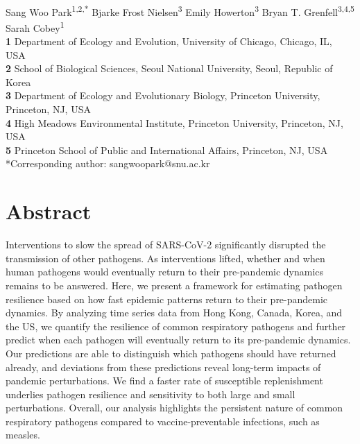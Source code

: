 \documentclass[12pt]{article}
\date{\today}
\begin{document}
\begin{flushleft}{
	\Large
	\textbf{}
}
\newline
\\
Sang Woo Park\textsuperscript{1,2,*}
Bjarke Frost Nielsen\textsuperscript{3}
Emily Howerton\textsuperscript{3}
Bryan T. Grenfell\textsuperscript{3,4,5}
Sarah Cobey\textsuperscript{1}
\bigskip
\\
\textbf{1} Department of Ecology and Evolution, University of Chicago, Chicago, IL, USA
\\
\textbf{2} School of Biological Sciences, Seoul National University, Seoul, Republic of Korea
\\
\textbf{3} Department of Ecology and Evolutionary Biology, Princeton University, Princeton, NJ, USA
\\
\textbf{4} High Meadows Environmental Institute, Princeton University, Princeton, NJ, USA
\\
\textbf{5} Princeton School of Public and International Affairs, Princeton, NJ, USA
\bigskip
*Corresponding author: sangwoopark@snu.ac.kr
\end{flushleft}

\section*{Abstract}

Interventions to slow the spread of SARS-CoV-2 significantly disrupted the transmission of other pathogens. As interventions lifted, whether and when human pathogens would eventually return to their pre-pandemic dynamics remains to be answered. Here, we present a framework for estimating pathogen resilience based on how fast epidemic patterns return to their pre-pandemic dynamics. By analyzing time series data from Hong Kong, Canada, Korea, and the US, we quantify the resilience of common respiratory pathogens and further predict when each pathogen will eventually return to its pre-pandemic dynamics. Our predictions are able to distinguish which pathogens should have returned already, and deviations from these predictions reveal long-term impacts of pandemic perturbations. We find a faster rate of susceptible replenishment underlies pathogen resilience and sensitivity to both large and small perturbations. Overall, our analysis highlights the persistent nature of common respiratory pathogens compared to vaccine-preventable infections, such as measles.
\end{document}
